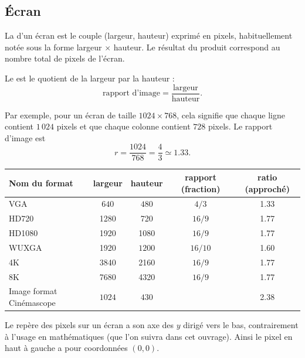 \documentclass[11pt,class=report,crop=false]{standalone}
\begin{document}
\subsection{Écran}

La  d'un écran est le couple (largeur, hauteur) exprimé en pixels, habituellement notée sous la forme largeur $\times$ hauteur. Le résultat du produit
correspond au nombre total de pixels de l'écran.




Le  est le quotient de la largeur par la hauteur :
$$\text{rapport d'image} = \frac{\text{largeur}}{\text{hauteur}}.$$

Par exemple, pour un écran de taille $1024 \times 768$, cela signifie que chaque ligne contient $1\,024$ pixels et que chaque colonne contient $728$ pixels. Le rapport d'image est
$$r = \frac{1024}{768} = \frac{4}{3} \simeq 1.33.$$

\begin{center}
\begin{tabular}{|l|c|c|c|c|} 
	\hline
	Nom du format & largeur & hauteur & rapport (fraction) & ratio (approché) \\ \hline \hline
	VGA & $640$ & $480$ & $4/3$ &  1.33 \\ \hline	
	HD720 & 1280 & 720 & $16/9$ & 1.77 \\ \hline 
	HD1080 & 1920 & 1080 & $16/9$ & 1.77 \\ \hline 	
	WUXGA & 1920 & $1200$ & $16/10$ & 1.60 \\ \hline 
	4K    & 3840 & 2160 & $16/9$ & 1.77 \\ \hline
	8K    & 7680 & 4320 & $16/9$ & 1.77 \\ \hline
	Image format Cinémascope & $1024$ & $430$ & & 2.38 \\ \hline  
\end{tabular}
\end{center}

\medskip

Le repère des pixels sur un écran a son axe des \og{}$y$\fg{} dirigé vers le bas, contrairement à l'usage en mathématiques (que l'on suivra dans cet ouvrage).
Ainsi le pixel en haut à gauche a pour coordonnées $(0,0)$.



\end{document}
